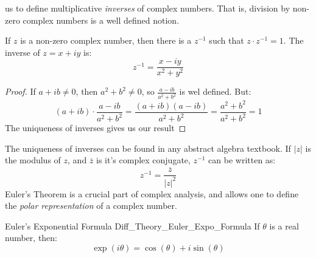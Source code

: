 \documentclass[crop=false,class=book,oneside]{standalone}
\begin{document}
            us to define multiplicative \textit{inverses}
            of complex numbers. That is, division by
            non-zero complex numbers is a well defined
            notion.
            \begin{theorem}
                \label{thm:Diff_Theory_Complex_Inverse}
                If $z$ is a non-zero complex number, then there is
                a $z^{-1}$ such that $z\cdot{z}^{-1}=1$. The
                inverse of $z=x+iy$ is:
                \begin{equation}
                    z^{-1}=\frac{x-iy}{x^{2}+y^{2}}
                \end{equation}
            \end{theorem}
            \begin{proof}
                If $a+ib\ne{0}$, then $a^2+b^2\ne{0}$, so
                $\frac{a-ib}{a^2+b^2}$ is wel defined. But:
                \begin{equation}
                    (a+ib)\cdot \frac{a-ib}{a^2+b^2}
                    =\frac{(a+ib)(a-ib)}{a^2+b^2}
                    =\frac{a^2+b^2}{a^2+b^2}=1
                \end{equation}
                The uniqueness of inverses gives us our result
            \end{proof}
            The uniqueness of inverses can be found in any
            abstract algebra textbook.
            If $|z|$ is the modulus of $z$, and
            $\overline{z}$ is it's complex conjugate,
            $z^{-1}$ can be written as:
            \begin{equation}
                z^{-1}=\frac{\overline{z}}{|z|^{2}}
            \end{equation}
            Euler's Theorem is a crucial
            part of complex analysis, and allows one to define
            the \textit{polar representation} of a complex number.
            \begin{ftheorem}{Euler's Exponential Formula}
                            {Diff_Theory_Euler_Expo_Formula}
                If $\theta$ is a real number, then:
                \begin{equation}
                    \exp(i\theta)=\cos(\theta)+i\sin(\theta)
                \end{equation}
            \end{ftheorem}
\end{document}
